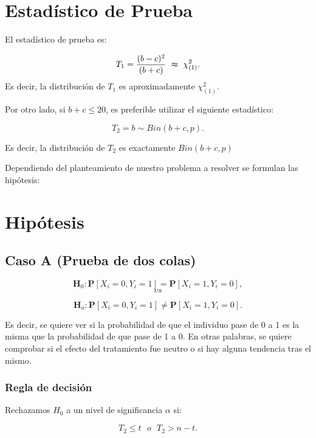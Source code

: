\documentclass[
  a4paper,
  oneside,
  openany]{book}
\begin{document}
\hypertarget{estaduxedstico-de-prueba-3}{%
\section{Estadístico de Prueba}\label{estaduxedstico-de-prueba-3}}

El estadístico de prueba es:

\[T_{1}=\frac{(b-c)^2}{(b+c)} \ \thickapprox \ \chi^{2}_{(1)}.\]
Es decir, la distribución de \(T_{1}\) es aproximadamente \(\chi^{2}_{(1)}\).

Por otro lado, si \(b+c\leq20\), es preferible utilizar el siguiente estadístico:

\[T_{2}=b\sim Bin(b+c,p).\]

Es decir, la distribución de \(T_{2}\) es exactamente \(Bin(b+c,p)\)

Dependiendo del planteamiento de nuestro problema a resolver se formulan las hipótesis:

\hypertarget{hipuxf3tesis-3}{%
\section{Hipótesis}\label{hipuxf3tesis-3}}

\hypertarget{caso-a-prueba-de-dos-colas-3}{%
\subsection*{Caso A (Prueba de dos colas)}\label{caso-a-prueba-de-dos-colas-3}}


\[\textbf{H}_0: \mathbf{P}[X_{i}=0,Y_{i}=1]= \mathbf{P}[X_{i}=1,Y_{i}=0],\]
\[vs\]

\[\textbf{H}_a: \mathbf{P}[X_{i}=0,Y_{i}=1]\neq \mathbf{P}[X_{i}=1,Y_{i}=0].\]

Es decir, se quiere ver si la probabilidad de que el individuo pase de 0 a 1 es la misma que la probabilidad de que pase de 1 a 0. En otras palabras, se quiere comprobar si el efecto del tratamiento fue neutro o si hay alguna tendencia tras el mismo.

\hypertarget{regla-de-decisiuxf3n-9}{%
\subsubsection*{Regla de decisión}\label{regla-de-decisiuxf3n-9}}


Rechazamos \(H_0\) a un nivel de significancia \(\alpha\) si:

\[T_{2} \leq t \ \ \   o \ \ \ T_{2}>n-t.\]
\end{document}
